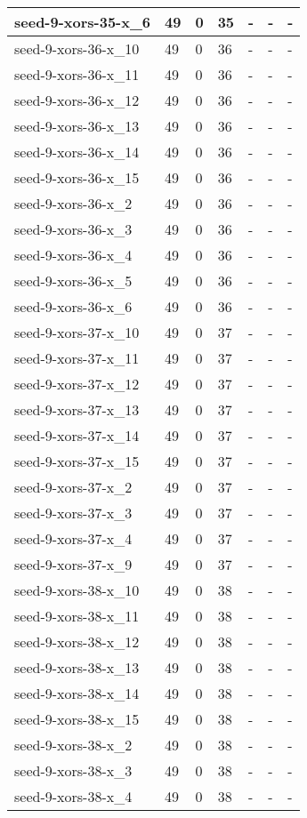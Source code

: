 \begin{scriptsize}
\begin{longtable}{|p{5cm}|l|l|l|l|l|l|}
seed-9-xors-35-x\_6&49&0&35&-&-&- \\ \hline 
seed-9-xors-36-x\_10&49&0&36&-&-&- \\ \hline 
seed-9-xors-36-x\_11&49&0&36&-&-&- \\ \hline 
seed-9-xors-36-x\_12&49&0&36&-&-&- \\ \hline 
seed-9-xors-36-x\_13&49&0&36&-&-&- \\ \hline 
seed-9-xors-36-x\_14&49&0&36&-&-&- \\ \hline 
seed-9-xors-36-x\_15&49&0&36&-&-&- \\ \hline 
seed-9-xors-36-x\_2&49&0&36&-&-&- \\ \hline 
seed-9-xors-36-x\_3&49&0&36&-&-&- \\ \hline 
seed-9-xors-36-x\_4&49&0&36&-&-&- \\ \hline 
seed-9-xors-36-x\_5&49&0&36&-&-&- \\ \hline 
seed-9-xors-36-x\_6&49&0&36&-&-&- \\ \hline 
seed-9-xors-37-x\_10&49&0&37&-&-&- \\ \hline 
seed-9-xors-37-x\_11&49&0&37&-&-&- \\ \hline 
seed-9-xors-37-x\_12&49&0&37&-&-&- \\ \hline 
seed-9-xors-37-x\_13&49&0&37&-&-&- \\ \hline 
seed-9-xors-37-x\_14&49&0&37&-&-&- \\ \hline 
seed-9-xors-37-x\_15&49&0&37&-&-&- \\ \hline 
seed-9-xors-37-x\_2&49&0&37&-&-&- \\ \hline 
seed-9-xors-37-x\_3&49&0&37&-&-&- \\ \hline 
seed-9-xors-37-x\_4&49&0&37&-&-&- \\ \hline 
seed-9-xors-37-x\_9&49&0&37&-&-&- \\ \hline 
seed-9-xors-38-x\_10&49&0&38&-&-&- \\ \hline 
seed-9-xors-38-x\_11&49&0&38&-&-&- \\ \hline 
seed-9-xors-38-x\_12&49&0&38&-&-&- \\ \hline 
seed-9-xors-38-x\_13&49&0&38&-&-&- \\ \hline 
seed-9-xors-38-x\_14&49&0&38&-&-&- \\ \hline 
seed-9-xors-38-x\_15&49&0&38&-&-&- \\ \hline 
seed-9-xors-38-x\_2&49&0&38&-&-&- \\ \hline 
seed-9-xors-38-x\_3&49&0&38&-&-&- \\ \hline 
seed-9-xors-38-x\_4&49&0&38&-&-&- \\ \hline 

\end{longtable}
\end{scriptsize}
